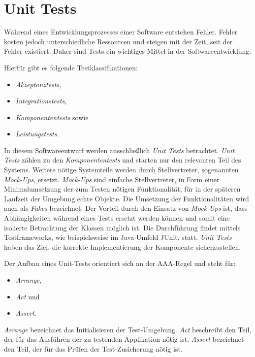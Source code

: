 \chapter{Unit Tests}
\label{unit-tests}
Während eines Entwicklungsprozesses einer Software entstehen Fehler.
Fehler kosten jedoch unterschiedliche Ressourcen und steigen mit der Zeit, seit der Fehler existiert.
Daher sind Tests ein wichtiges Mittel in der Softwareentwicklung.

Hierfür gibt es folgende Testklassifikationen:
\begin{itemize}
    \item \textit{Akzeptanztests},
    \item \textit{Integrationstests},
    \item \textit{Komponententests} sowie
    \item \textit{Leistungstests}.
\end{itemize}

In diesem Softwareentwurf werden ausschließlich \textit{Unit Tests} betrachtet.
\textit{Unit Tests} zählen zu den \textit{Komponententests} und starten nur den relevanten Teil des Systems.
Weitere nötige Systemteile werden durch Stellvertreter, sogenannten \textit{Mock-Ups}, ersetzt.
\textit{Mock-Ups} sind einfache Stellvertreter, in Form einer Minimalumsetzung der zum Testen nötigen Funktionalität, für in der späteren Laufzeit der Umgebung \glqq echte\grqq{} Objekte.
Die Umsetzung der Funktionalitäten wird auch als \textit{Fakes} bezeichnet.
Der Vorteil durch den Einsatz von \textit{Mock-Ups} ist, dass Abhängigkeiten während eines Tests ersetzt werden können und somit eine isolierte Betrachtung der Klassen möglich ist.
Die Durchführung findet mittels Testframeworks, wie beispielsweise im Java-Umfeld JUnit, statt.
\textit{Unit Tests} haben das Ziel, die korrekte Implementierung der Komponente sicherzustellen.

Der Aufbau eines Unit-Tests orientiert sich an der AAA-Regel und steht für:
\begin{itemize}
    \item \textit{Arrange},
    \item \textit{Act} und
    \item \textit{Assert}.
\end{itemize}

\textit{Arrange} bezeichnet das Initialisieren der Test-Umgebung.
\textit{Act} beschreibt den Teil, der für das Ausführen der zu testenden Applikation nötig ist.
\textit{Assert} bezeichnet den Teil, der für das Prüfen der Test-Zusicherung nötig ist.


